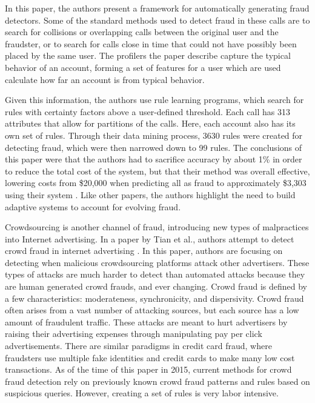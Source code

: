 \documentclass[midd]{thesis}
\begin{document}
In this paper, the authors present a framework for automatically generating fraud detectors. Some of the standard methods used to detect fraud in these calls are to search for collisions or overlapping calls between the original user and the fraudster, or to search for calls close in time that could not have possibly been placed by the same user. The profilers the paper describe capture the typical behavior of an account, forming a set of features for a user which are used calculate how far an account is from typical behavior. 

Given this information, the authors use rule learning programs, which search for rules with certainty factors above a user-defined threshold. Each call has 313 attributes that allow for partitions of the calls. Here, each account also has its own set of rules. Through their data mining process, 3630 rules were created for detecting fraud, which were then narrowed down to 99 rules. The conclusions of this paper were that the authors had to sacrifice accuracy by about 1\% in order to reduce the total cost of the system, but that their method was overall effective, lowering costs from \$20,000 when predicting all as fraud to approximately \$3,303 using their system \cite{Fawcett1996}. Like other papers, the authors highlight the need to build adaptive systems to account for evolving fraud.

Crowdsourcing is another channel of fraud, introducing new types of malpractices into Internet advertising. In a paper by Tian et al., authors attempt to detect crowd fraud in internet advertising  \cite{Tian}. In this paper, authors are focusing on detecting when malicious crowdsourcing platforms attack other advertisers. These types of attacks are much harder to detect than automated attacks because they are human generated crowd frauds, and ever changing. Crowd fraud is defined by a few characteristics: moderateness, synchronicity, and dispersivity. Crowd fraud often arises from a vast number of attacking sources, but each source has a low amount of fraudulent traffic. These attacks are meant to hurt advertisers by raising their advertising expenses through manipulating pay per click advertisements. There are similar paradigms in credit card fraud, where fraudsters use multiple fake identities and credit cards to make many low cost transactions. As of the time of this paper in 2015, current methods for crowd fraud detection rely on previously known crowd fraud patterns and rules based on suspicious queries. However, creating a set of rules is very labor intensive. 
\end{document}
